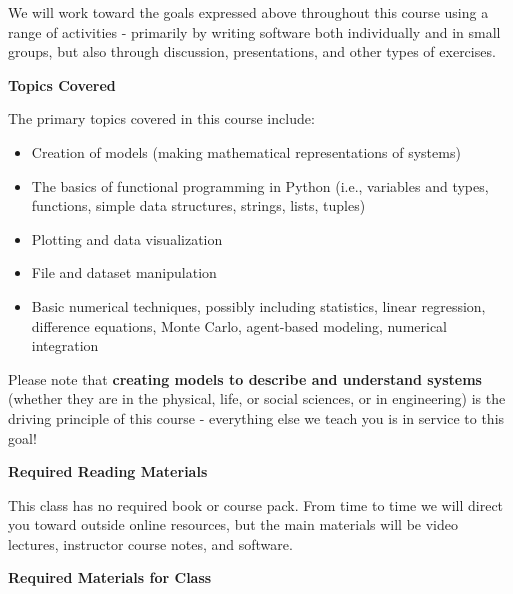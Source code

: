 \documentclass[oneside,letterpaper,11pt]{exam}
\begin{document}
{\noindent We will work toward the goals expressed above throughout this course using a range of activities - primarily by writing software both individually and in small groups, but also through discussion, presentations, and other types of exercises.}

\begin{center}
	\vspace{5pt}
	\textbf{Topics Covered}
	\vspace{5pt}
\end{center}

{\noindent The primary topics covered in this course include:}
\begin{itemize}
\item[-] Creation of models (making mathematical representations of systems)\\[-15pt]
\item[-] The basics of functional programming in Python (i.e., variables and types, functions, simple data structures, strings, lists, tuples)\\[-15pt]
\item[-] Plotting and data visualization\\[-15pt]
\item[-] File and dataset manipulation\\[-15pt]
\item[-] Basic numerical techniques, possibly including statistics, linear regression,
difference equations, Monte Carlo, agent-based modeling, numerical integration
\end{itemize}

{\noindent Please note that \textbf{creating models to describe and understand systems} (whether they are in the physical, life, or social sciences, or in engineering) is the driving principle of this course - everything else we teach you is in service to this goal!}


\begin{center}
	\vspace{5pt}
	\textbf{Required Reading Materials}
	\vspace{5pt}
\end{center}

{\noindent This class has no required book or course pack. From time to time we will direct you toward outside online resources, but the main materials will be video lectures, instructor course notes, and software.}


\begin{center}
	\vspace{5pt}
	\textbf{Required Materials for Class}
	\vspace{5pt}
\end{center}
\end{document}
